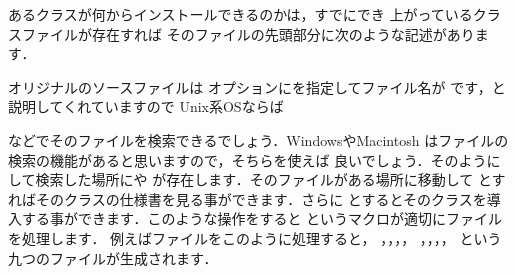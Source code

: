 {あるクラスが何からインストールできるのかは，すでにでき
上がっているクラスファイルが存在すれば
そのファイルの先頭部分に次のような記述があります．

\begin{InTeX}
\end{InTeX}

オリジナルのソースファイルは
オプションにを指定してファイル名が
です，と説明してくれていますので
Unix系OSならば
\begin{InTerm}
\end{InTerm}
などでそのファイルを検索できるでしょう．WindowsやMacintosh
はファイルの検索の機能があると思いますので，そちらを使えば
良いでしょう．そのようにして検索した場所にや
が存在します．そのファイルがある場所に移動して
とすればそのクラスの仕様書を見る事ができます．さらに
とするとそのクラスを導入する事ができます．このような操作をすると
というマクロが適切にファイルを処理します．
例えばファイルをこのように処理すると，
，，，，
，，，，
という九つのファイルが生成されます．

}
